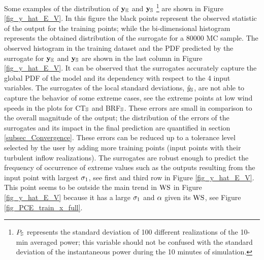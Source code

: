 \documentclass[preprint,12pt]{elsarticle}
\begin{document}
Some examples of the distribution of  $\mathbf{y}_{\mathbb{E}}$ and $\mathbf{y}_{\mathbb{S}}$ \footnote{$P_{\mathbb{S}}$ represents the standard deviation of 100 different realizations of the 10-min averaged power; this variable should not be confused with the standard deviation of the instantaneous power during the 10 minutes of simulation.} are shown in Figure \ref{fig_y_hat_E_V}. In this figure the black points represent the observed statistic of the output for the training points; while the bi-dimensional histogram represents the obtained distribution of the surrogate for a 80000 MC sample. The observed histogram in the training dataset and the PDF predicted by the surrogate for $\mathbf{y}_{\mathbb{E}}$ and $\mathbf{y}_{\mathbb{S}}$ are shown in the last column in Figure \ref{fig_y_hat_E_V}. It can be observed that the surrogates accurately capture the global PDF of the model and its dependency with respect to the 4 input variables. The surrogates of the local standard deviations, $\hat{y}_{\mathbb{S}}$, are not able to capture the behavior of some extreme cases, see the extreme points at low wind speeds in the plots for CT$_{\mathbb{S}}$ and BRF$_{\mathbb{S}}$. These errors are small in comparison to the overall magnitude of the output; the distribution of the errors of the surrogates and its impact in the final prediction are quantified in section \ref{subsec_Convergence}. These errors can be reduced up to a tolerance level selected by the user by adding more training points (input points with their turbulent inflow realizations). The surrogates are robust enough to predict the frequency of occurrence of extreme values such as the outputs resulting from the input point with largest $\sigma_{1}$, see first and third row in Figure \ref{fig_y_hat_E_V}. This point seems to be outside the main trend in $\text{WS}$ in Figure \ref{fig_y_hat_E_V} because it has a large $\sigma_{1}$ and $\alpha$ given its $\text{WS}$, see Figure \ref{fig_PCE_train_x_full}.
\end{document}
